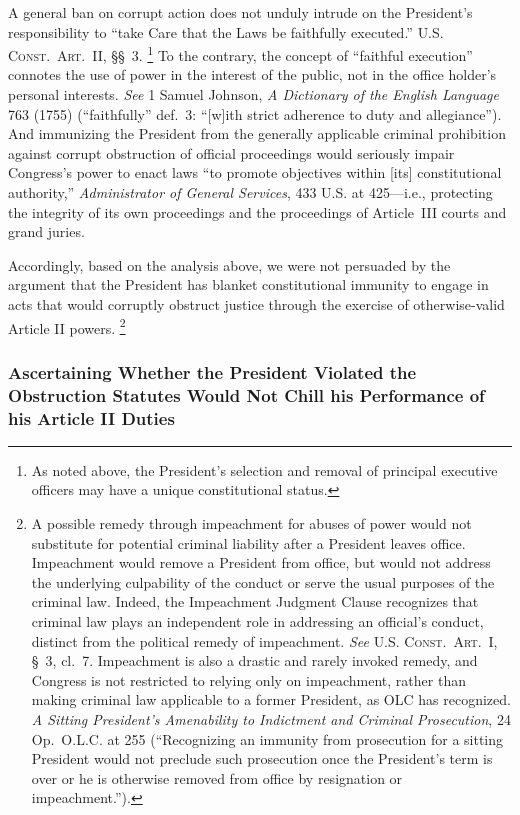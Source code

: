 A general ban on corrupt action does not unduly intrude on the President's responsibility to ``take Care that the Laws be faithfully executed.''
\textsc{U.S. Const.\ Art.~II}, \S\S~3.%
\footnote{As noted above, the President's selection and removal of principal executive officers may have a unique constitutional status.}
To the contrary, the concept of ``faithful execution'' connotes the use of power in the interest of the public, not in the office holder's personal interests.
\textit{See} 1 Samuel Johnson, \textit{A Dictionary of the English Language} 763 (1755) (``faithfully'' def.~3: ``[w]ith strict adherence to duty and allegiance'').
And immunizing the President from the generally applicable criminal prohibition against corrupt obstruction of official proceedings would seriously impair Congress's power to enact laws ``to promote objectives within [its] constitutional authority,'' \textit{Administrator of General Services}, 433 U.S. at 425---i.e., protecting the integrity of its own proceedings and the proceedings of Article~III courts and grand juries.

Accordingly, based on the analysis above, we were not persuaded by the argument that the President has blanket constitutional immunity to engage in acts that would corruptly obstruct justice through the exercise of otherwise-valid Article II powers.%
\footnote{A possible remedy through impeachment for abuses of power would not substitute for potential criminal liability after a President leaves office.
Impeachment would remove a President from office, but would not address the underlying culpability of the conduct or serve the usual purposes of the criminal law.
Indeed, the Impeachment Judgment Clause recognizes that criminal law plays an independent role in addressing an official's conduct, distinct from the political remedy of impeachment.
\textit{See} \textsc{U.S. Const.\ Art}.~I, \S~3, cl.~7.
Impeachment is also a drastic and rarely invoked remedy, and Congress is not restricted to relying only on impeachment, rather than making criminal law applicable to a former President, as OLC has recognized.
\textit{A Sitting President's Amenability to Indictment and Criminal Prosecution}, 24 Op.\ O.L.C. at 255 (``Recognizing an immunity from prosecution for a sitting President would not preclude such prosecution once the President's term is over or he is otherwise removed from office by resignation or impeachment.'').}

\subsubsection{Ascertaining Whether the President Violated the Obstruction Statutes Would Not Chill his Performance of his Article II Duties}

